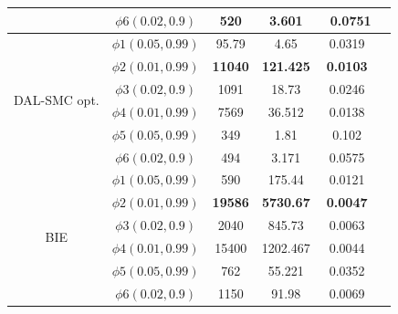 \begin{table}
\begin{tabular}{c c c c c c}
                & $\phi6(0.02,0.9)$ &  520& 3.601& \ 0.0751\\      
        \hline 
         \multirow{6}{1.5cm}{DAL-SMC opt.}  
                & $\phi1(0.05,0.99)$ &  95.79&  4.65&  0.0319\\ 
                & $\phi2(0.01,0.99)$ &  \textbf{11040}&  \textbf{121.425} &  \textbf{0.0103}\\ 
                & $\phi3(0.02,0.9)$ &  1091& 18.73& 0.0246\\ 
                & $\phi4(0.01,0.99)$ &  7569&  36.512 &  0.0138\\ 
                & $\phi5(0.05,0.99)$ &  349&  1.81&  0.102\\ 
                & $\phi6(0.02,0.9)$ &  494& 3.171& 0.0575\\     
        \hline 
         \multirow{6}{1.5cm}{BIE}  
                & $\phi1(0.05,0.99)$ &  590&  175.44&  0.0121\\ 
                & $\phi2(0.01,0.99)$ &  \textbf{19586}&  \textbf{5730.67} &  \textbf{0.0047} \\ 
                & $\phi3(0.02,0.9)$ &  2040& 845.73& 0.0063\\ 
                & $\phi4(0.01,0.99)$ & 15400&  1202.467 &  0.0044\\ 
                & $\phi5(0.05,0.99)$ &  762&  55.221&  0.0352\\ 
                & $\phi6(0.02,0.9)$ &  1150& 91.98& 0.0069\\      
        \hline 
\end{tabular} 
\label{ta-rs}
\end{table}


